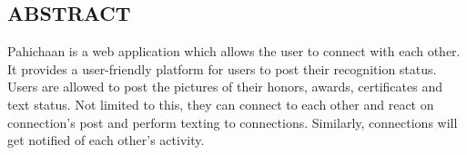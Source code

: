 \begin{center}
		\section*{ABSTRACT}
	\end{center}
	Pahichaan is a web application which allows the user to connect with each
other. It provides a user-friendly platform for users to post their recognition
status. Users are allowed to post the pictures of their honors, awards,
certificates and text status. Not limited to this, they can connect to each
other and react on connection’s post and perform texting to connections.
Similarly, connections will get notified of each other’s activity.\\